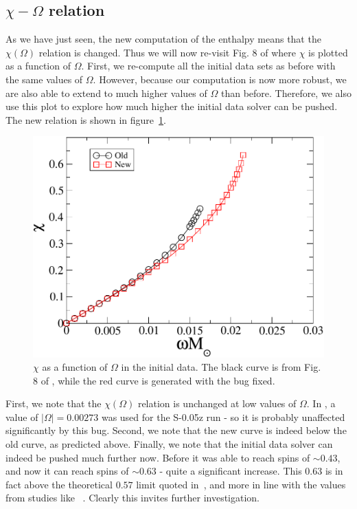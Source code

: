 \subsection{$\chi - \Omega$ relation}
As we have just seen, the new computation of the enthalpy means that
the $\chi(\Omega)$ relation is changed. Thus we will now re-visit Fig. 8 of
\cite{Tacik:2015tja} where $\chi$ is plotted as a function of
$\Omega$. First, we re-compute all the initial data sets as before
with the same values of $\Omega$. However, because our computation is
now more robust, we are also able to extend to much higher values of
$\Omega$ than before. Therefore, we also use this plot to explore how
much higher the initial data solver can be pushed.  The new relation
is shown in figure~\ref{fig:NewChiVOmega}. 
\begin{figure}[!ht]
\includegraphics[width=0.95\columnwidth]{chap6/NewChiVOmega}
\caption{\label{fig:NewChiVOmega} $\chi$ as a function of $\Omega$ in
  the initial data. The black curve is from Fig. 8 of
  \cite{Tacik:2015tja}, while the red curve is generated with the bug fixed.}
\end{figure}
First, we note that the $\chi(\Omega)$ relation is unchanged at low
values of $\Omega$. In  \cite{Tacik:2015tja}, a value of
$|\Omega|=0.00273$ was used for the S-0.05z run - so it is probably
unaffected significantly by this bug. Second, we note that the new
curve is indeed below the old curve, as predicted above. Finally, we
note that the initial data solver can indeed be pushed much further
now. Before it was able to reach spins of $\sim 0.43$, and now it can
reach spins of $\sim 0.63$ - quite a significant increase. This $0.63$
is in fact above the theoretical $0.57$ limit quoted
in~\cite{Ansorg:2003br}, and more in line with the values from studies
like ~\cite{Lo:2010bj}. Clearly this invites further investigation.

